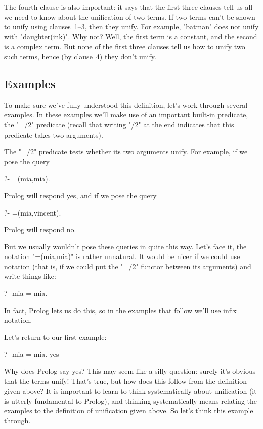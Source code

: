 The fourth clause is also important: it says that the first three
clauses tell us all we need to know about the unification of two
terms. If two terms can't be shown to unify using clauses~1--3, then
they  unify. For example, "batman" does not unify with
"daughter(ink)". Why not? Well, the first term is a constant, and the
second is a complex term.  But none of the first three clauses tell us
how to unify two such terms, hence (by clause~4) they don't unify.


\subsection*{Examples}\label{SUBSEC.L2.EXAMPLES}


To make sure we've fully understood this definition, let's work
through several examples.  In these examples we'll make use of an
important built-in predicate, the "=/2" predicate (recall that
writing "/2" at the end indicates that
this predicate takes two arguments).


The "=/2" predicate tests whether its two arguments
unify. For example, if we pose the query
%
\begin{LPNcodedisplay}
?- =(mia,mia).
\end{LPNcodedisplay}
%
Prolog will respond yes, and if we pose the query
\begin{LPNcodedisplay}
?- =(mia,vincent).
\end{LPNcodedisplay}
%
Prolog will respond no.

But we usually wouldn't pose these queries in quite this way.  Let's
face it, the notation "=(mia,mia)" is rather unnatural. It would be
nicer if we could use  notation (that is, if we could
put the "=/2" functor between its arguments) and write things like:
%
\begin{LPNcodedisplay}
?- mia = mia.
\end{LPNcodedisplay}
In fact, Prolog lets us do this, so in the examples that follow we'll
use infix notation.

Let's return to our first example:
%
\begin{LPNcodedisplay}
?- mia = mia.
yes
\end{LPNcodedisplay}
%

Why does Prolog say yes? This may seem like a silly question: surely
it's obvious that the terms unify! That's true, but how does this
follow from the definition given above? It is important to learn to
think systematically about unification (it is utterly fundamental to
Prolog), and thinking systematically means relating the examples
to the definition of unification given above. So let's think this
example through.

